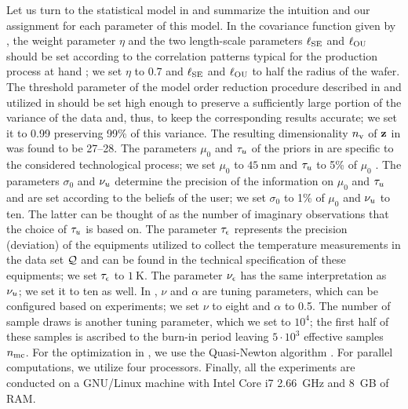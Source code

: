Let us turn to the statistical model in  and summarize the intuition and our assignment for each parameter of this model.
In the covariance function given by , the weight parameter $\eta$ and the two length-scale parameters $\ell_{\text{SE}}$ and $\ell_{\text{OU}}$ should be set according to the correlation patterns typical for the production process at hand \cite{chandrakasan2001, cheng2011}; we set $\eta$ to 0.7 and $\ell_{\text{SE}}$ and $\ell_{\text{OU}}$ to half the radius of the wafer.
The threshold parameter of the model order reduction procedure described in  and utilized in  should be set high enough to preserve a sufficiently large portion of the variance of the data and, thus, to keep the corresponding results accurate; we set it to 0.99 preserving 99\% of this variance. The resulting dimensionality ${n_\text{v}}$ of $\mathbf{z}$ in  was found to be 27--28.
The parameters $\mu_0$ and $\tau_u$ of the priors in  are specific to the considered technological process; we set $\mu_0$ to $45~\text{nm}$ and $\tau_u$ to 5\% of $\mu_0$ \cite{juan2012}.
The parameters $\sigma_0$ and $\nu_u$ determine the precision of the information on $\mu_0$ and $\tau_u$ and are set according to the beliefs of the user; we set $\sigma_0$ to 1\% of $\mu_0$ and $\nu_u$ to ten.
The latter can be thought of as the number of imaginary observations that the choice of $\tau_u$ is based on.
The parameter $\tau_\epsilon$ represents the precision (deviation) of the equipments utilized to collect the temperature measurements in the data set $\mathcal{Q}$ and can be found in the technical specification of these equipments; we set $\tau_\epsilon$ to $1~\text{K}$. The parameter $\nu_\epsilon$ has the same interpretation as $\nu_u$; we set it to ten as well.
In , $\nu$ and $\alpha$ are tuning parameters, which can be configured based on experiments; we set $\nu$ to eight and $\alpha$ to 0.5.
The number of sample draws is another tuning parameter, which we set to $10^4$; the first half of these samples is ascribed to the burn-in period leaving $5 \cdot 10^3$ effective samples ${n_\text{mc}}$.
For the optimization in , we use the Quasi-Newton algorithm \cite{press2007}.
For parallel computations, we utilize four processors.
Finally, all the experiments are conducted on a GNU/Linux machine with Intel Core i7 2.66~GHz and 8~GB of RAM.

